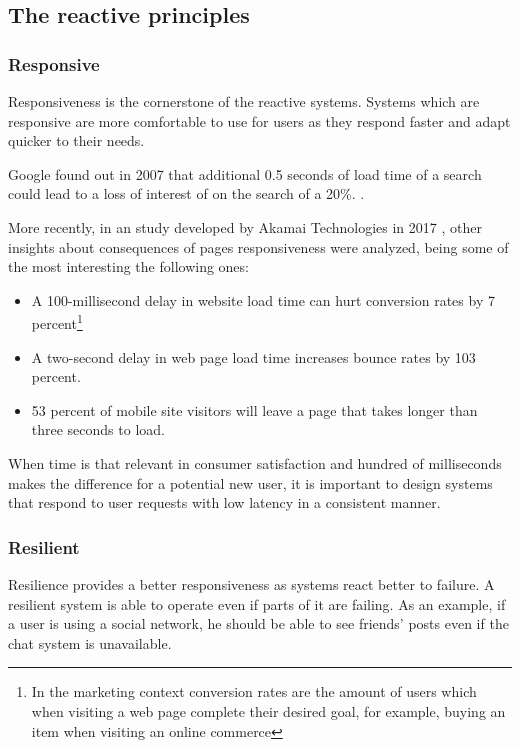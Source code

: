 \documentclass[../main.tex]{subfiles}
\begin{document}
\subsection{The reactive principles}
\subsubsection{Responsive}

Responsiveness is the cornerstone of the reactive
systems. Systems which are responsive are more comfortable to use for users as
they respond faster and adapt quicker to their needs.

Google found out in 2007 that additional 0.5 seconds of load time of a search
could lead to a loss of interest of on the search of a 20\%. \autocite{MayerGoogleYouTube}.

More recently, in an study developed by Akamai Technologies in 2017 \autocite{Akamai2017TheAkamai}, other
insights about consequences of pages responsiveness were analyzed, being some of the most
interesting the following ones:

\begin{itemize}
    \item A 100-millisecond delay in website load time can hurt conversion rates
by 7 percent\footnote{In the marketing context conversion rates are the amount of users
    which when visiting a web page complete their desired goal, for example, buying an item
    when visiting an online commerce}

    \item A two-second delay in web page load time increases bounce rates by 103
percent.

    \item 53 percent of mobile site visitors will leave a page that takes longer
than three seconds to load.
\end{itemize}

When time is that relevant in consumer satisfaction and hundred of milliseconds
makes the difference for a potential new user, it is important to design systems
that respond to user requests with low latency in a consistent manner.

\subsubsection{Resilient}

Resilience provides a better responsiveness as systems
react better to failure. A resilient system is able to operate even if parts of
it are failing. As an example, if a user is using a social network, he should be
able to see friends' posts even if the chat system is unavailable.
\end{document}
